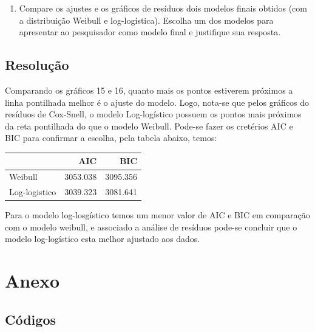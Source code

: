 \documentclass[]{article}
\providecommand{\tightlist}{%
  \setlength{\itemsep}{0pt}\setlength{\parskip}{0pt}}
\begin{document}
\begin{enumerate}
\def\labelenumi{(\alph{enumi})}
\setcounter{enumi}{7}
\tightlist
\item
  Compare os ajustes e os gráficos de resíduos dois modelos finais
  obtidos (com a distribuição Weibull e log-logística). Escolha um dos
  modelos para apresentar ao pesquisador como modelo final e justifique
  sua resposta.
\end{enumerate}

\subsection{Resolução}\label{resolucao-7}

Comparando os gráficos 15 e 16, quanto mais os pontos estiverem próximos
a linha pontilhada melhor é o ajuste do modelo. Logo, nota-se que pelos
gráficos do resíduos de Cox-Snell, o modelo Log-logístico possuem os
pontos mais próximos da reta pontilhada do que o modelo Weibull. Pode-se
fazer os cretérios AIC e BIC para confirmar a escolha, pela tabela
abaixo, temos:

\begin{longtable}[]{@{}lrr@{}}
\toprule
& AIC & BIC\tabularnewline
\midrule
\endhead
Weibull & 3053.038 & 3095.356\tabularnewline
Log-logistico & 3039.323 & 3081.641\tabularnewline
\bottomrule
\end{longtable}

Para o modelo log-losgístico temos um menor valor de AIC e BIC em
comparação com o modelo weibull, e associado a análise de resíduos
pode-se concluir que o modelo log-logístico esta melhor ajustado aos
dados.

\section{Anexo}\label{anexo}

\subsection{Códigos}\label{codigos}
\end{document}
